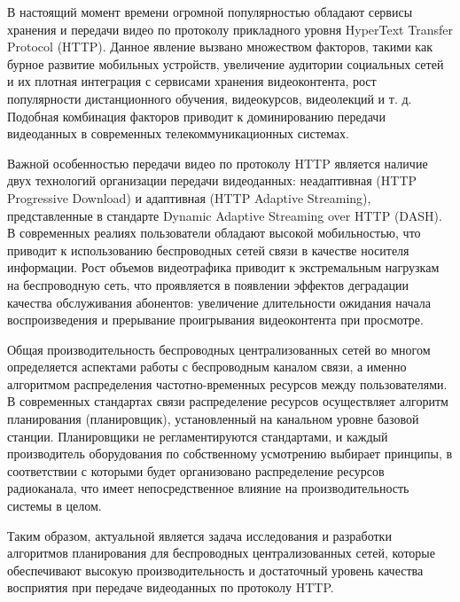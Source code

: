 {\actuality} В настоящий момент времени огромной популярностью обладают сервисы хранения и передачи видео по протоколу прикладного уровня HyperText Transfer Protocol (HTTP). Данное явление вызвано множеством факторов, такими как бурное развитие мобильных устройств, увеличение аудитории социальных сетей и их плотная интеграция с сервисами хранения видеоконтента, рост популярности дистанционного обучения, видеокурсов, видеолекций и т. д. Подобная комбинация факторов приводит к доминированию передачи видеоданных в современных телекоммуникационных системах.

Важной особенностью передачи видео по протоколу HTTP является наличие двух технологий организации передачи видеоданных: неадаптивная (HTTP Progressive Download) и адаптивная (HTTP Adaptive Streaming), представленные в стандарте Dynamic Adaptive Streaming over HTTP (DASH). В современных реалиях пользователи обладают высокой мобильностью, что приводит к использованию беспроводных сетей связи в качестве носителя информации. Рост объемов видеотрафика приводит к экстремальным нагрузкам на беспроводную сеть, что проявляется в появлении эффектов деградации качества обслуживания абонентов: увеличение длительности ожидания начала воспроизведения и прерывание проигрывания видеоконтента при просмотре.

Общая производительность беспроводных централизованных сетей во многом определяется аспектами работы с беспроводным каналом связи, а именно алгоритмом распределения частотно-временных ресурсов между пользователями. В современных стандартах связи распределение ресурсов осуществляет алгоритм планирования (планировщик), установленный на канальном уровне базовой станции. Планировщики не регламентируются стандартами, и каждый производитель оборудования по собственному усмотрению выбирает принципы, в соответствии с которыми будет организовано распределение ресурсов радиоканала, что имеет непосредственное влияние на производительность системы в целом.

Таким образом, актуальной является задача исследования и разработки алгоритмов планирования для беспроводных централизованных сетей, которые обеспечивают высокую производительность и достаточный уровень качества восприятия при передаче видеоданных по протоколу HTTP.

